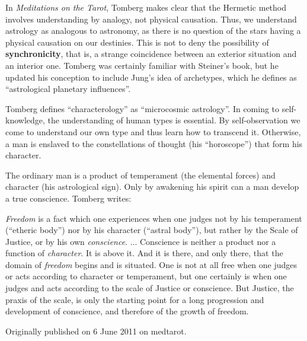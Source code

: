 In \textit{Meditations on the Tarot}, Tomberg makes clear that the Hermetic method involves understanding by analogy, not physical causation. Thus, we understand astrology as analogous to astronomy, as there is no question of the stars having a physical causation on our destinies. This is not to deny the possibility of \textbf{synchronicity}, that is, a strange coincidence between an exterior situation and an interior one. Tomberg was certainly familiar with Steiner's book, but he updated his conception to include Jung's idea of archetypes, which he defines as ``astrological planetary influences''.

Tomberg defines ``characterology'' as ``microcosmic astrology''. In coming to self-knowledge, the understanding of human types is essential. By self-observation we come to understand our own type and thus learn how to transcend it. Otherwise, a man is enslaved to the constellations of thought (his ``horoscope'') that form his character.

The ordinary man is a product of temperament (the elemental forces) and character (his astrological sign). Only by awakening his spirit can a man develop a true conscience. Tomberg writes:

\begin{quotex}
\emph{Freedom} is a fact which one experiences when one judges not by his temperament (``etheric body'') nor by his character (``astral body''), but rather by the Scale of Justice, or by his own \emph{conscience}. ... Conscience is neither a product nor a function of \emph{character}. It is above it. And it is there, and only there, that the domain of \emph{freedom} begins and is situated. One is not at all free when one judges or acts according to character or temperament, but one certainly is when one judges and acts according to the scale of Justice or conscience. But Justice, the praxis of the scale, is only the starting point for a long progression and development of conscience, and therefore of the growth of freedom.
\end{quotex}

Originally published on 6 June 2011 on medtarot.



